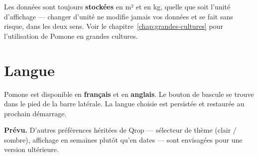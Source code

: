 \begin{notebox}
Les données sont toujours \textbf{stockées} en m² et en kg, quelle que soit l'unité d'affichage — changer d'unité ne modifie jamais vos données et se fait sans risque, dans les deux sens. Voir le chapitre~\ref{chap:grandes-cultures} pour l'utilisation de Pomone en grandes cultures.
\end{notebox}

\section{Langue}

Pomone est disponible en \textbf{français} et en \textbf{anglais}. Le bouton de bascule se trouve dans le pied de la barre latérale. La langue choisie est persistée et restaurée au prochain démarrage.

\begin{notebox}
\textbf{Prévu.} D'autres préférences héritées de Qrop — sélecteur de thème (clair / sombre), affichage en semaines plutôt qu'en dates — sont envisagées pour une version ultérieure.
\end{notebox}
